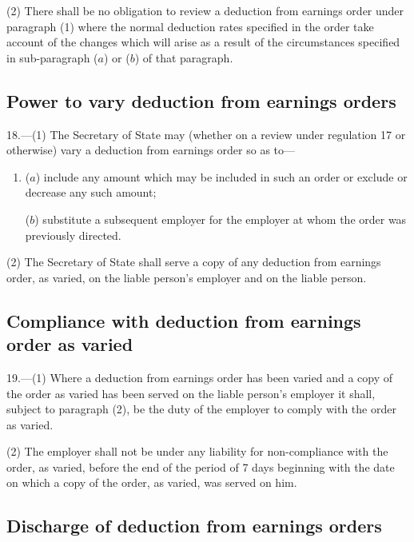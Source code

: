 \documentclass[12pt,a4paper]{article}
\begin{document}
(2) There shall be no obligation to review a deduction from earnings order under paragraph (1) where the normal deduction rates specified in the order take account of the changes which will arise as a result of the circumstances specified in sub-paragraph ($a$) or ($b$) of that paragraph.


\subsection[18. Power to vary deduction from earnings orders]{Power to vary deduction from earnings orders}

18.—(1) The Secretary of State may (whether on a review under regulation 17 or otherwise) vary a deduction from earnings order so as to—
\begin{enumerate}\item[]
($a$) include any amount which may be included in such an order or exclude or decrease any such amount;

($b$) substitute a subsequent employer for the employer at whom the order was previously directed.
\end{enumerate}

(2) The Secretary of State shall serve a copy of any deduction from earnings order, as varied, on the liable person’s employer and on the liable person.

\subsection[19. Compliance with deduction from earnings order as varied]{Compliance with deduction from earnings order as varied}

19.—(1) Where a deduction from earnings order has been varied and a copy of the order as varied has been served on the liable person’s employer it shall, subject to paragraph (2), be the duty of the employer to comply with the order as varied.

(2) The employer shall not be under any liability for non-compliance with the order, as varied, before the end of the period of 7 days beginning with the date on which a copy of the order, as varied, was served on him.

\subsection[20. Discharge of deduction from earnings orders]{Discharge of deduction from earnings orders}
\end{document}
